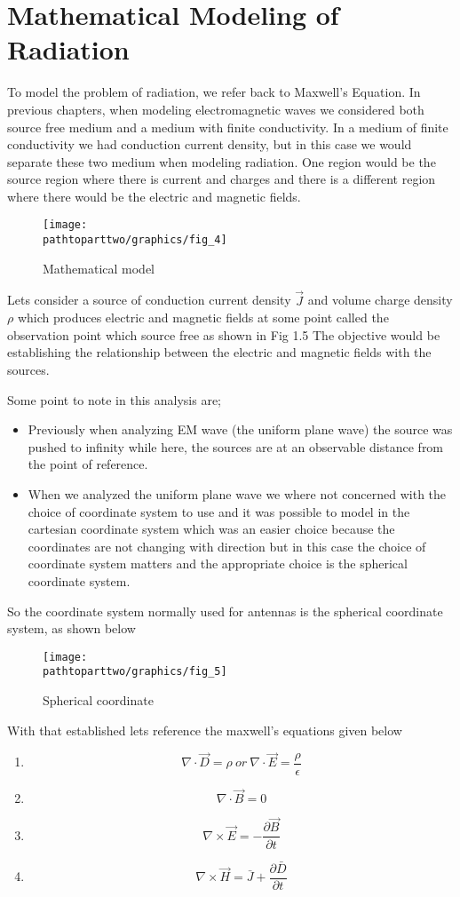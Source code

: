 \section{Mathematical Modeling of Radiation}
To model the problem of radiation, we refer back to Maxwell's Equation. In previous chapters, when modeling electromagnetic waves we considered both source free medium and a medium with finite conductivity. In a medium of finite conductivity we had conduction current density, but in this case we would separate these two medium when modeling radiation. One region would be the source region where there is current and charges and there is a different region where there would be the electric and magnetic fields.
\begin{figure}
\centering
\texttt{[image: \\pathtoparttwo/graphics/fig\_4]}
\caption{Mathematical model}
\end{figure}

Lets consider a source of conduction current density $\vec{J}$ and volume charge density $\rho$ which produces electric and magnetic fields at some point called the observation point which source free as shown in Fig 1.5 The objective would be establishing the relationship between the electric and magnetic fields with the sources.

Some point to note in this analysis are;
\begin{itemize}
\item Previously when analyzing EM wave (the uniform plane wave) the source was pushed to infinity while here, the sources are at an observable distance from the point of reference.
\item When we analyzed the uniform plane wave we where not concerned with the choice of coordinate system to use and it was possible to model in the cartesian coordinate system which was an easier choice because the coordinates are not changing with direction but in this case the choice of coordinate system matters and the appropriate choice is the spherical coordinate system.
\end{itemize}

So the coordinate system normally used for antennas is the spherical coordinate system, as shown below

\begin{figure}
\centering
\texttt{[image: \\pathtoparttwo/graphics/fig\_5]}
\caption{Spherical coordinate}
\end{figure}

With that established lets reference the maxwell's equations given below
\begin{enumerate}
\item $$ \nabla\cdot\vec{D} =\rho\ or\ \nabla \cdot\vec{E} =\dfrac{\rho}{\epsilon} $$	
\item $$ \nabla\cdot\vec{B}=0$$	
\item $$\nabla\times\vec{E}=- \dfrac{\partial\vec{B}}{\partial t}$$
\item $$\nabla\times\vec{H}=\bar{J}+\dfrac{\partial\bar{D}}{\partial t}$$
\end{enumerate}

